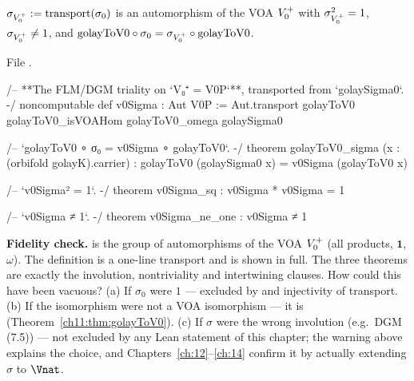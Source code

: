 \begin{theorem}\label{ch11:thm:v0Sigma}
$\sigma_{V_0^{+}}:=\mathrm{transport}(\sigma_0)$ is an automorphism of the VOA $V_0^{+}$ with
$\sigma_{V_0^{+}}^2=1$, $\sigma_{V_0^{+}}\ne1$, and $\mathrm{golayToV0}\circ\sigma_0=\sigma_{V_0^{+}}\circ\mathrm{golayToV0}$.
\end{theorem}
\noindent File .
\begin{leancode}
/-- **The FLM/DGM triality on `V₀⁺ = V0P`**, transported from `golaySigma0`. -/
noncomputable def v0Sigma : Aut V0P :=
  Aut.transport golayToV0 golayToV0_isVOAHom golayToV0_omega golaySigma0

/-- `golayToV0 ∘ σ₀ = v0Sigma ∘ golayToV0`. -/
theorem golayToV0_sigma (x : (orbifold golayK).carrier) :
    golayToV0 (golaySigma0 x) = v0Sigma (golayToV0 x)

/-- `v0Sigma² = 1`. -/
theorem v0Sigma_sq : v0Sigma * v0Sigma = 1

/-- `v0Sigma ≠ 1`. -/
theorem v0Sigma_ne_one : v0Sigma ≠ 1
\end{leancode}
\begin{dictionary}
\textbf{Fidelity check.}   is the group of automorphisms of the VOA $V_0^{+}$ (all products,
$\mathbf 1$, $\omega$).  The definition is a one-line transport and is shown in full.  The three
theorems are exactly the involution, nontriviality and intertwining clauses.  How could this have been
vacuous?  (a) If $\sigma_0$ were $1$ --- excluded by  and injectivity of
transport.  (b) If the isomorphism  were not a VOA isomorphism --- it is
(Theorem~\ref{ch11:thm:golayToV0}).  (c) If $\sigma$ were the wrong involution (e.g.\ DGM (7.5)) ---
not excluded by any Lean statement of this chapter; the warning above explains the choice, and
Chapters~\ref{ch:12}--\ref{ch:14} confirm it by actually extending $\sigma$ to $\Vnat$.
\end{dictionary}

